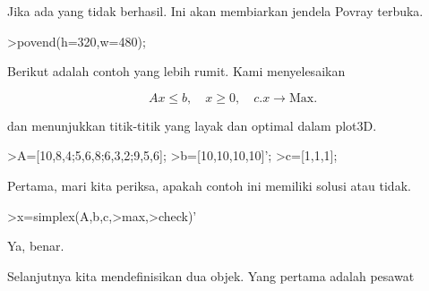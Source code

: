 \documentclass{article}
\begin{document}
\begin{eulernotebook}
\begin{eulercomment}
\begin{eulercomment}
\begin{eulercomment}
Jika ada yang tidak berhasil. Ini akan membiarkan jendela Povray
terbuka.
\end{eulercomment}
\begin{eulerprompt}
>povend(h=320,w=480);
\end{eulerprompt}
\begin{eulercomment}
Berikut adalah contoh yang lebih rumit. Kami menyelesaikan

\end{eulercomment}
\begin{eulerformula}
\[
Ax \le b, \quad x \ge 0, \quad c.x \to \text{Max.}
\]
\end{eulerformula}
\begin{eulercomment}
dan menunjukkan titik-titik yang layak dan optimal dalam plot3D.
\end{eulercomment}
\begin{eulerprompt}
>A=[10,8,4;5,6,8;6,3,2;9,5,6];
>b=[10,10,10,10]';
>c=[1,1,1];
\end{eulerprompt}
\begin{eulercomment}
Pertama, mari kita periksa, apakah contoh ini memiliki solusi atau
tidak.
\end{eulercomment}
\begin{eulerprompt}
>x=simplex(A,b,c,>max,>check)'
\end{eulerprompt}
\begin{euleroutput}
  [0,  1,  0.5]
\end{euleroutput}
\begin{eulercomment}
Ya, benar.

Selanjutnya kita mendefinisikan dua objek. Yang pertama adalah pesawat


\end{eulercomment}
\end{eulercomment}
\end{eulercomment}
\end{eulernotebook}
\end{document}
